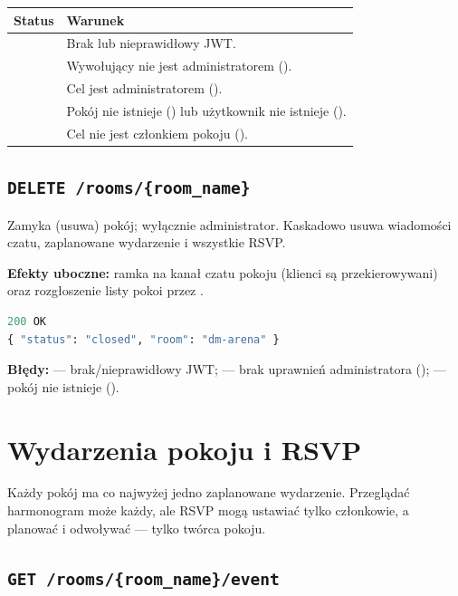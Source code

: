 \begin{tabularx}{\textwidth}{lY}
\toprule
Status & Warunek \\
\midrule
{} & Brak lub nieprawidłowy JWT. \\
 & Wywołujący nie jest administratorem (). \\
 & Cel jest administratorem (). \\
 & Pokój nie istnieje () lub użytkownik nie istnieje (). \\
 & Cel nie jest członkiem pokoju (). \\
\bottomrule
\end{tabularx}

\subsection{\texttt{DELETE /rooms/\{room\_name\}}}

Zamyka (usuwa) pokój; wyłącznie administrator. Kaskadowo usuwa wiadomości czatu, zaplanowane
wydarzenie i wszystkie RSVP.

\textbf{Efekty uboczne:} ramka  na kanał czatu
pokoju (klienci są przekierowywani) oraz rozgłoszenie listy pokoi przez .

\begin{lstlisting}[language=Python]
200 OK
{ "status": "closed", "room": "dm-arena" }
\end{lstlisting}

\textbf{Błędy:}  --- brak/nieprawidłowy JWT;  --- brak uprawnień administratora
();  --- pokój nie istnieje ().

\section{Wydarzenia pokoju i RSVP}
\label{sec:api-events}

Każdy pokój ma co najwyżej jedno zaplanowane wydarzenie. Przeglądać harmonogram może każdy, ale
RSVP mogą ustawiać tylko członkowie, a planować i odwoływać --- tylko twórca pokoju.

\subsection{\texttt{GET /rooms/\{room\_name\}/event}}

